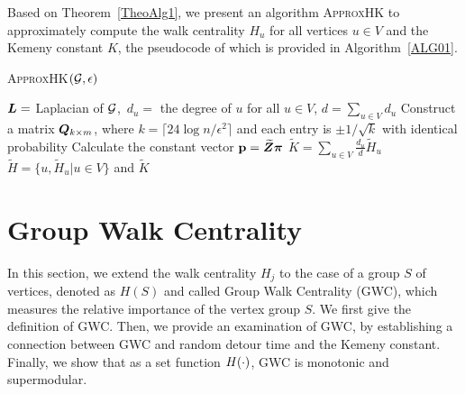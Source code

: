 \documentclass[10pt,twocolumn,twoside]{IEEEtran}
\begin{document}
Based on Theorem~\ref{TheoAlg1}, we  present an algorithm \textsc{ApproxHK} to approximately compute the walk centrality \(H_u\) for all  vertices  \(u \in V\) and the Kemeny constant \(K\), the pseudocode of which is provided in Algorithm~\ref{ALG01}.

\begin{algorithm}
    \caption{\textsc{ApproxHK}\((\mathcal{G}, \epsilon)\)}
    \label{ALG01}
    \(\boldsymbol{L}=\) Laplacian of \(\mathcal{G}\),\, \(d_u=\) the degree of \(u\) for all \(u\in V\), \(d=\sum_{u \in V} d_u\)\;  Construct a matrix \(\boldsymbol{Q}_{k \times m}\),  where \(k=\lceil 24\log n/\epsilon^2 \rceil\) and each entry is \(\pm 1/\sqrt{k}\) with identical probability\;
    Calculate the constant vector \({\bf p}=\widetilde{\boldsymbol{Z}} \boldsymbol{\pi}\)\;
    \(\tilde{K}=\sum_{u \in V} \frac{d_u}{d} \tilde{H}_u\)\;
    \Return \(\tilde{H}=\{u,\tilde{H}_u| u \in V\}\) and \(\tilde{K}\)
\end{algorithm}

\section{Group Walk Centrality}

In this section, we extend the walk centrality \(H_j\) to the case of a group  $S$ of  vertices, denoted as \(H(S)\) and called Group Walk Centrality (GWC), which measures the relative importance of the vertex group $S$. We first give the definition of GWC. Then, we provide an examination of GWC, by establishing a connection between GWC and random detour time and the Kemeny constant. Finally, we show that as a set function \(H(\cdot)\), GWC is monotonic and supermodular.

\end{document}
